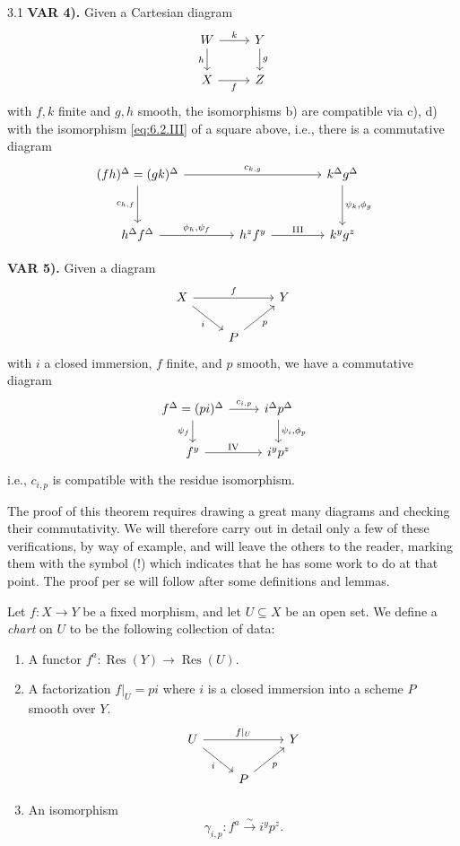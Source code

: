 \begin{booktheorem}{3.1}
\medskip{}\label{var:6.3.4}\noindent\textbf{VAR 4).} Given a Cartesian diagram
\[
\begin{tikzcd}
	W \arrow[r, "k"] \arrow[d, "h"'] & Y \arrow[d, "g"] \\
	X \arrow[r, "f"'] & Z
\end{tikzcd}
\]
with $f,k$ finite and $g,h$ smooth, the isomorphisms b) are compatible via c), d) with the isomorphism \eqref{eq:6.2.III} of a square above, i.e., there is a commutative diagram
\[
\begin{tikzcd}[row sep=3em, column sep=4em]
	(fh)^\Delta = (gk)^\Delta
	\arrow[rr, "c_{k,g}"]
	\arrow[d, "c_{h,f}"']
	&& k^\Delta g^\Delta
	\arrow[d, "{\psi_k, \phi_g}"] \\
	h^\Delta f^\Delta
	\arrow[r, "{\phi_h, \psi_f}"]
	& h^z f^y
	\arrow[r, "\text{III}"]
	& k^y g^z
\end{tikzcd}
\]

\medskip{}\label{var:6.3.5}\noindent\textbf{VAR 5).} Given a diagram
\[
\begin{tikzcd}
X \ar[rr,"f"] \ar[dr,"i"'] & & Y \\
& P \ar[ur,"p"']
\end{tikzcd}
\]
with $i$ a closed immersion, $f$ finite, and $p$ smooth, we have a commutative diagram
\[
\begin{tikzcd}
f^{\Delta}=(pi)^{\Delta} \ar[r,"c_{i,p}"] \ar[d,"\psi_f"'] & i^{\Delta}p^{\Delta}\ar[d,"{\psi_i,\phi_p}"] \\
f^{y} \ar[r,"\mathrm{IV}"] & i^{y}p^{z}
\end{tikzcd}
\]
i.e., $c_{i,p}$ is compatible with the residue isomorphism.
\end{booktheorem}

The proof of this theorem requires drawing a great many diagrams and checking their commutativity. We will therefore carry out in detail only a few of these verifications, by way of example, and will leave the others to the reader, marking them with the symbol (!) which indicates that he has some work to do at that point. The proof per se will follow after some definitions and lemmas.

\begin{definition*}
Let $f\colon X\to Y$ be a fixed morphism, and let $U\subseteq X$ be an open set. We define a \emph{chart} on $U$ to be the following collection of data:
\begin{enumerate}
\item[1)] A functor $f^{a}\colon \operatorname{Res}(Y)\to \operatorname{Res}(U)$.
\item[2)] A factorization $f|_{U} = pi$ where $i$ is a closed immersion into a scheme $P$ smooth over $Y$.
\[
\begin{tikzcd}
U \ar[rr,"f|_{U}"] \ar[dr,"i"'] & & Y \\
& P \ar[ur,"p"']
\end{tikzcd}
\]
\item[3)] An isomorphism
\[
\gamma_{i,p}\colon f^{a} \xrightarrow{\sim} i^{y}p^{z}.
\]
\end{enumerate}
\end{definition*}

